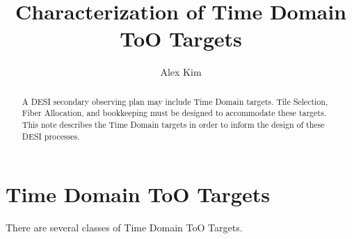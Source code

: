 \documentclass[11pt]{article}   	%
\begin{document}
\title{Characterization of Time Domain ToO Targets}
\author{Alex Kim}
\date{}							%
\maketitle
\begin{abstract}
A DESI secondary observing plan may include Time Domain targets.  Tile Selection, Fiber Allocation, and bookkeeping must be
designed to accommodate these targets.  This note describes the Time Domain targets in order to inform the design
of these DESI processes.
\end{abstract}

\section{Time Domain ToO Targets}
There are several classes of Time Domain ToO Targets.  
\end{document}
